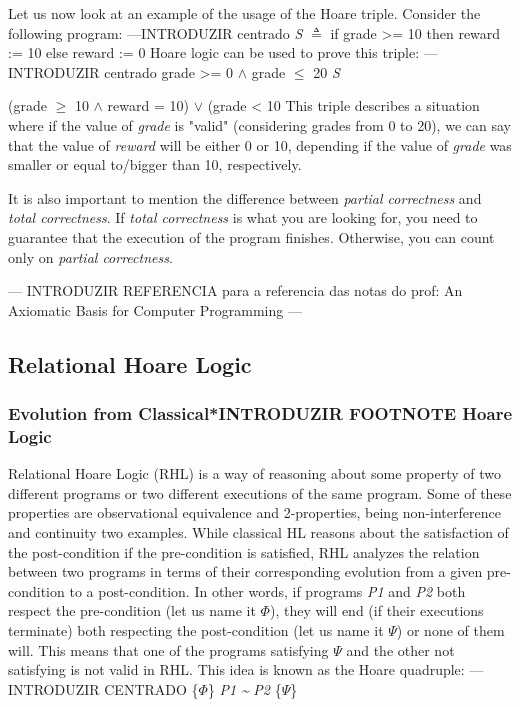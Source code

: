 Let us now look at an example of the usage of the Hoare triple. Consider the following program:
---INTRODUZIR centrado \emph{S} $\triangleq$ if grade >= 10 then reward := 10 else reward := 0 
Hoare logic can be used to prove this triple:
---INTRODUZIR centrado {grade >= 0 $\land$ grade $\leq$ 20} \emph{S} {(grade $\geq$ 10 $\land$ reward = 10) $\lor$ (grade < 10 
This triple describes a situation where if the value of \emph{grade} is "valid" (considering grades from 0 to 20), we can say that the value of \emph{reward} will be either 0 or 10, depending if the value of \emph{grade} was smaller or equal to/bigger than 10, respectively.

It is also important to mention the difference between \emph{partial correctness} and \emph{total correctness}.
If \emph{total correctness} is what you are looking for, you need to guarantee that the execution of the program finishes.
Otherwise, you can count only on \emph{partial correctness}.

--- INTRODUZIR REFERENCIA para a referencia das notas do prof: An Axiomatic Basis for Computer Programming ---


\subsection{Relational Hoare Logic} 
\label{sub:relational_hoare_logic}

\subsubsection{Evolution from Classical*INTRODUZIR FOOTNOTE Hoare Logic}
\label{sub:relational_hoare_logic_motivation}
Relational Hoare Logic (RHL) is a way of reasoning about some property of two different programs or two different executions of the same program.
Some of these properties are observational equivalence and 2-properties, being non-interference and continuity two examples.
While classical HL reasons about the satisfaction of the post-condition if the pre-condition is satisfied, RHL analyzes the relation between two programs in terms of their corresponding evolution from a given pre-condition to a post-condition.
In other words, if programs \emph{P1} and \emph{P2} both respect the pre-condition (let us name it $\Phi$), they will end (if their executions terminate) both respecting the post-condition (let us name it $\Psi$) or none of them will.
This means that one of the programs satisfying $\Psi$ and the other not satisfying is not valid in RHL.
This idea is known as the Hoare quadruple:
--- INTRODUZIR CENTRADO \{$\Phi$\} \emph{P1} \emph{\textasciitilde} \emph{P2} \{$\Psi$\}

}
